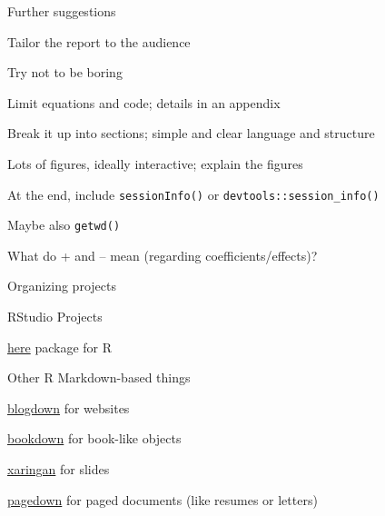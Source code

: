 \documentclass[aspectratio=169,12pt,t]{beamer}
\begin{document}
\begin{frame}[c,fragile]{Further suggestions}

  \bbi
\item Tailor the report to the audience
\item Try not to be boring
\item Limit equations and code; details in an appendix
\item Break it up into sections; simple and clear language and structure
\item Lots of figures, ideally interactive; {\vhilit explain} the figures
\item At the end, include \verb|sessionInfo()| or
  \verb|devtools::session_info()|
\item Maybe also \verb|getwd()|
\item What do + and -- mean (regarding coefficients/effects)?
  \ei

\end{frame}



\begin{frame}{Organizing projects}


  \bbi
\item RStudio Projects
\item \href{https://here.r-lib.org/}{here} package for R
  \ei

\end{frame}




\begin{frame}{Other R Markdown-based things}


  \bbi
\item \href{https://bookdown.org/yihui/blogdown/}{blogdown} for websites
\item \href{https://bookdown.org/yihui/bookdown/}{bookdown} for book-like objects
\item \href{https://github.com/yihui/xaringan}{xaringan} for slides
\item \href{https://pagedown.rbind.io/}{pagedown} for paged documents
  (like resumes or letters)
  \ei

\end{frame}
\end{document}

